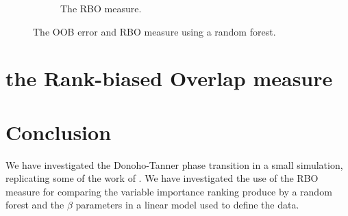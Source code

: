 \documentclass[11pt]{article}
\begin{document}
\begin{figure}[tbhp]
\begin{subfigure}[t]{0.5\linewidth}
    \caption{The RBO measure.}
    \label{figure:ranger_rbo_Stodden_simulation.png}
  \end{subfigure} 
  \caption{The  OOB error and RBO measure using a random forest.}
  \label{figure:ranger_error_and_rbo_Stodden_simulation.png}
\end{figure}

\section{the Rank-biased Overlap measure
\label{section:the.Rank.biased.Overlap.measure}}
\cite{Webber2010}
\cite{gespeR.2015} 


\section{Conclusion}
We have investigated the Donoho-Tanner phase transition in a small simulation, replicating some of the work of
\cite{Donoho.and.Stodden.2006}. We have investigated the use of the RBO measure for comparing the variable importance
ranking produce by a random forest and the $\beta$ parameters in a linear model used to define the data.


\end{document}
